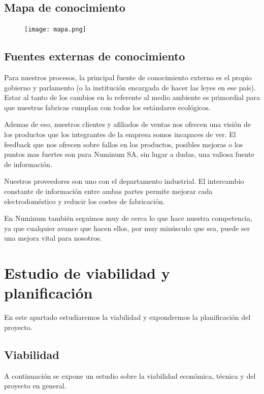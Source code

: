 \documentclass[twoside]{article}
\begin{document}
\newpage
\subsection{Mapa de conocimiento}

\begin{figure}[ht!]
	\texttt{[image: mapa.png]}
	\centering
\end{figure}

\subsection{Fuentes externas de conocimiento}

Para nuestros procesos, la principal fuente de conocimiento externo es el propio gobierno y parlamento (o la institución encargada de hacer las leyes en ese país). Estar al tanto de los cambios en lo referente al medio ambiente es primordial para que nuestras fabricas cumplan con todos los estándares ecológicos. \par
Ademas de eso, nuestros clientes y afiliados de ventas nos ofrecen una visión de los productos que los integrantes de la empresa somos incapaces de ver. El feedback que nos ofrecen sobre fallos en los productos, posibles mejoras o los puntos mas fuertes son para Numinum SA, sin lugar a dudas, una valiosa fuente de información.\par
Nuestros proveedores son uno con el departamento industrial. El intercambio constante de información entre ambas partes permite mejorar cada electrodoméstico y reducir los costes de fabricación.\par
En Numinum también seguimos muy de cerca lo que hace nuestra competencia, ya que cualquier avance que hacen ellos, por muy minúsculo que sea, puede ser una mejora vital para nosotros.

\newpage
\section{Estudio de viabilidad y planificación}

En este apartado estudiaremos la viabilidad y expondremos la planificación del proyecto.

\subsection{Viabilidad}

A continuación se expone un estudio sobre la viabilidad económica, técnica y del proyecto en general.
\end{document}
